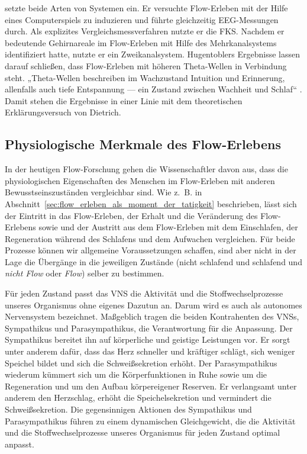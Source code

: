 \citet{Hugentobler2011} setzte beide Arten von Systemen ein. Er versuchte Flow-Erleben mit der Hilfe eines Computerspiels zu induzieren und führte gleichzeitig \ac{EEG}-Messungen durch. Als explizites Vergleichsmessverfahren nutzte er die \ac{FKS}. Nachdem er bedeutende Gehirnareale im Flow-Erleben mit Hilfe des Mehrkanalsystems identifiziert hatte, nutzte er ein Zweikanalsystem. Hugentoblers Ergebnisse lassen darauf schließen, dass Flow-Erleben mit höheren Theta-Wellen in Verbindung steht. „Theta-Wellen beschreiben im Wachzustand Intuition und Erinnerung, allenfalls auch tiefe Entspannung — ein Zustand zwischen Wachheit und Schlaf“ \citep[S.~149]{Hugentobler2011}. Damit stehen die Ergebnisse in einer Linie mit dem theoretischen Erklärungsversuch von Dietrich.

\subsection{Physiologische Merkmale des Flow-Erlebens} 

\label{sub:physiologische_merkmale_des_flow_erlebens}

In der heutigen Flow-Forschung gehen die Wissenschaftler davon aus, dass die physiologischen Eigenschaften des Menschen im Flow-Erleben mit anderen Bewusstseinszuständen vergleichbar sind. Wie z.~B. in Abschnitt~\ref{sec:flow_erleben_als_moment_der_tatigkeit} beschrieben, lässt sich der Eintritt in das Flow-Erleben, der Erhalt und die Veränderung des Flow-Erlebens sowie und der Austritt aus dem Flow-Erleben mit dem Einschlafen, der Regeneration während des Schlafens und dem Aufwachen vergleichen. Für beide Prozesse können wir allgemeine Voraussetzungen schaffen, sind aber nicht in der Lage die Übergänge in die jeweiligen Zustände (nicht schlafend und schlafend und \emph{nicht Flow} oder \emph{Flow}) selber zu bestimmen.

Für jeden Zustand passt das \ac{VNS} die Aktivität und die Stoffwechselprozesse unseres Organismus ohne eigenes Dazutun an. Darum wird es auch als autonomes Nervensystem bezeichnet. Maßgeblich tragen die beiden Kontrahenten des \acs{VNS}s, Sympathikus und Parasympathikus, die Verantwortung für die Anpassung. Der Sympathikus bereitet ihn auf körperliche und geistige Leistungen vor. Er sorgt unter anderem dafür, dass das Herz schneller und kräftiger schlägt, sich weniger Speichel bildet und sich die Schweißsekretion erhöht. Der Parasympathikus wiederum kümmert sich um die Körperfunktionen in Ruhe sowie um die Regeneration und um den Aufbau körpereigener Reserven. Er verlangsamt unter anderem den Herzschlag, erhöht die Speichelsekretion und vermindert die Schweißsekretion. Die gegensinnigen Aktionen des Sympathikus und Parasympathikus führen zu einem dynamischen Gleichgewicht, die die Aktivität und die Stoffwechselprozesse unseres Organismus für jeden Zustand optimal anpasst. 

